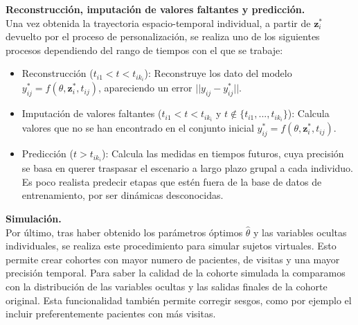\documentclass[12pt]{article}
\begin{document}
\begin{description}
	\item {\textbf{Reconstrucción, imputación de valores faltantes y predicción.}}\\
	Una vez obtenida la trayectoria espacio-temporal individual, a partir de $\mathbf{z}_{i}^{*}$ devuelto por el proceso de personalización, se realiza uno de los siguientes procesos dependiendo del rango de tiempos con el que se trabaje:
	\begin{itemize}
		\item Reconstrucción ($t_{i1}<t<t_{ik_{i}}$): Reconstruye los dato del modelo $y_{ij}^{*}=f(\theta, \mathbf{z}_{i}^{*}, t_{ij})$, apareciendo un error $||y_{ij}-y_{ij}^{*}||$.
		\item Imputación de valores faltantes ($t_{i1}<t<t_{ik_{i}}$ y $t \notin \{t_{i1},...,t_{ik_{i}}\}$): Calcula valores que no se han encontrado en el conjunto inicial $y_{ij}^{*}=f(\theta, \mathbf{z}_{i}^{*}, t_{ij})$.
		\item Predicción ($t>t_{ik_{i}}$): Calcula las medidas en tiempos futuros, cuya precisión se basa en querer traspasar el escenario a largo plazo grupal a cada individuo. Es poco realista predecir etapas que estén fuera de la base de datos de entrenamiento, por ser dinámicas desconocidas.
	\end{itemize}
	
	\item {\textbf{Simulación.}}\\
	Por último, tras haber obtenido los parámetros óptimos $\hat{\theta}$ y las variables ocultas individuales, se realiza este procedimiento para simular sujetos virtuales. Esto permite crear cohortes con mayor numero de pacientes, de visitas y una mayor precisión temporal. Para saber la calidad de la cohorte simulada la comparamos con la distribución de las variables ocultas y las salidas finales de la cohorte original. Esta funcionalidad también permite corregir sesgos, como por ejemplo el incluir preferentemente pacientes con más visitas. 
	

\end{description}
\end{document}
